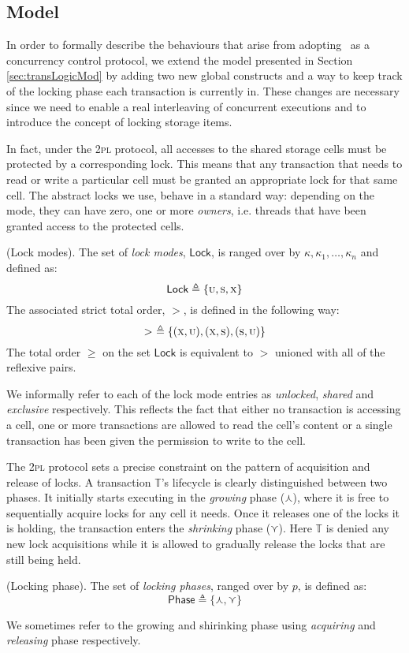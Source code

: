 \subsection{Model}

\label{sec:2plMod}

In order to formally describe the behaviours that arise from adopting \tpl\ as a concurrency control protocol, we extend the model presented in Section \ref{sec:transLogicMod} by adding two new global constructs and a way to keep track of the locking phase each transaction is currently in. These changes are necessary since we need to enable a real interleaving of concurrent executions and to introduce the concept of locking storage items.

In fact, under the \textsc{2pl} protocol, all accesses to the shared storage cells must be protected by a corresponding lock. This means that any transaction that needs to read or write a particular cell must be granted an appropriate lock for that same cell. The abstract locks we use, behave in a standard way: depending on the mode, they can have zero, one or more \textit{owners}, i.e. threads that have been granted access to the protected cells.

\begin{defn}
	(Lock modes).
	The set of \emph{lock modes}, $\mathsf{Lock}$, is ranged over by $\kappa, \kappa_1, \ldots, \kappa_n$ and defined as:
	\[
		\mathsf{Lock} \triangleq \{ \textsc{u}, \textsc{s}, \textsc{x} \}
	\]
	The associated strict total order, $>$, is defined in the following way:
	\[
		>\ \triangleq \{ (\textsc{x}, \textsc{u}), (\textsc{x}, \textsc{s}), (\textsc{s}, \textsc{u}) \}
	\]
	The total order $\geq$ on the set $\mathsf{Lock}$ is equivalent to $>$ unioned with all of the reflexive pairs.
\end{defn}
We informally refer to each of the lock mode entries as \textit{unlocked}, \textit{shared} and \textit{exclusive} respectively. This reflects the fact that either no transaction is accessing a cell, one or more transactions are allowed to read the cell's content or a single transaction has been given the permission to write to the cell.

The \textsc{2pl} protocol sets a precise constraint on the pattern of acquisition and release of locks. A transaction $\mathds{T}$'s lifecycle is clearly distinguished between two phases. It initially starts executing in the \textit{growing} phase ($\curlywedge$), where it is free to sequentially acquire locks  for any cell it needs. Once it releases one of the locks it is holding, the transaction enters the \textit{shrinking} phase ($\curlyvee$). Here $\mathds{T}$ is denied any new lock acquisitions while it is allowed to gradually release the locks that are still being held.
\begin{defn}
	(Locking phase).
	 The set of \emph{locking phases}, ranged over by $p$, is defined as:
	 \[
	 	\mathsf{Phase} \triangleq \{ \curlywedge, \curlyvee \}
	 \]
\end{defn}
We sometimes refer to the growing and shirinking phase using \textit{acquiring} and \textit{releasing} phase respectively.

